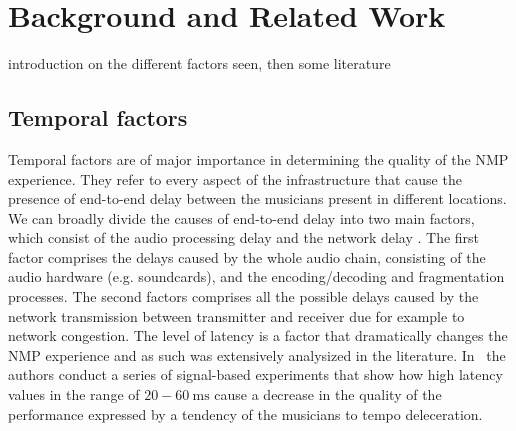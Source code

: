 \section{Background and Related Work}\label{sec:background}

introduction on the different factors seen, then some literature

\subsection{Temporal factors}
Temporal factors are of major importance in determining the quality of the NMP experience. They refer to every aspect of the infrastructure that cause the presence of end-to-end delay between the musicians present in different locations. 
We can broadly divide the causes of end-to-end delay into two main factors, which consist of the audio processing delay and the network delay \cite{Lakiotakis}. The first factor comprises the delays caused by the whole audio chain, consisting of the audio hardware (e.g. soundcards), and the encoding/decoding and fragmentation processes. The second factors comprises all the possible delays caused by the network transmission between transmitter and receiver due for example to network congestion.
The level of latency is a factor that dramatically changes the NMP experience and as such was extensively analysized in the literature. In~\cite{RottondiFeature} the authors conduct a series of signal-based experiments that show how high latency values in the range of $20-60~\mathrm{ms}$ cause a decrease in the quality of the performance expressed by a tendency of the musicians to tempo deleceration. 


